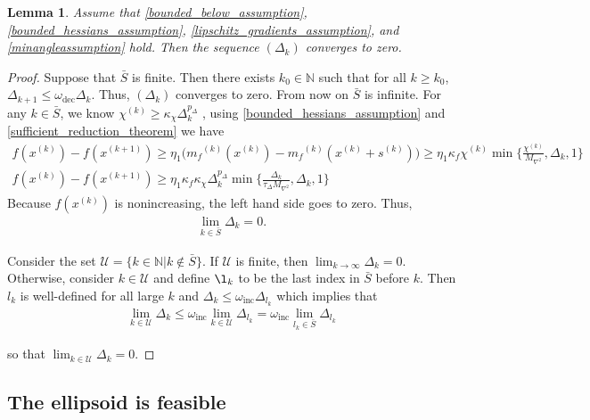 \documentclass{article}
\newtheorem{lemma}[theorem]{Lemma}
\theoremstyle{case}
\newcommand{\chik}{{\chi^{(k)}}}
\newcommand{\dk}{\Delta_k}
\newcommand{\dkpo}{\Delta_{k+1}}
\newcommand{\maxhessian}{{M_{\nabla^2}}}
\newcommand{\mfk}{{{m}_f}^{(k)}}
\newcommand{\naturals}{\mathbb N}
\newcommand{\oalpha}{\tau_{\Delta}}
\newcommand{\omegadec}{\omega_{\text{dec}}}
\newcommand{\omegainc}{\omega_{\text{inc}}}
\newcommand{\sk}{{{s}^{(k)}}}
\newcommand{\xkpo}{{{x}^{(k+1)}}}
\newcommand{\xk}{{x^{(k)}}}
\begin{document}
\begin{lemma}
\label{delta_to_zero}
Assume that
\cref{bounded_below_assumption},
\cref{bounded_hessians_assumption},
\cref{lipschitz_gradients_assumption},
and \cref{minangleassumption} hold.
Then the sequence $(\dk)$ converges to zero.
\end{lemma}
 

\begin{proof}

Suppose that $\bar{S}$ is finite. Then there exists $k_0 \in \naturals$ such that for all $k \ge  k_0$, $\dkpo \le \omegadec \dk$.
Thus, $(\dk)$ converges to zero.
From now on $\bar{S}$ is infinite.  
For any $k \in \bar{S}$, we know $\chik \ge \kappa_{\chi}\dk^{p_{\Delta}}$ , using \cref{bounded_hessians_assumption} and \cref{sufficient_reduction_theorem} we have
\begin{align*}
f(\xk) -  f(\xkpo) \ge \eta_1 \big (\mfk(\xk) - \mfk(\xk + \sk)\big ) \ge \eta_1 \kappa_f \chik \min\{\frac{\chik}{\maxhessian}, \dk, 1\}\\
f(\xk) - f(\xkpo) \ge \eta_1\kappa_f \kappa_{\chi}\dk^{p_{\Delta}}\min\{\frac{\dk}{\oalpha \maxhessian}, \dk, 1\}
\end{align*}
Because $f(\xk)$ is nonincreasing, the left hand side goes to zero.
Thus,
\begin{align}
\lim_{k \in \bar{S}} \dk = 0.
\end{align}

Consider the set
$\mathcal U = \{ k \in \naturals | k \not \in \bar S \}$.
If $\mathcal U$ is finite, then $\lim_{k\to\infty}\dk = 0$.
Otherwise, consider $k \in \mathcal U$ and define $\l_k$ to be the last index in $\bar S$ before $k$.
Then $l_k$ is well-defined for all large $k$  and $\dk \le \omegainc \Delta_{l_k}$ which implies that
\begin{align}
\lim_{k \in \mathcal U } \dk \le \omegainc \lim_{k \in \mathcal U} \Delta_{l_k} = \omegainc \lim_{l_k \in \bar{S}} \Delta_{l_k}
\end{align}

so that $\lim_{k \in \mathcal U} \dk = 0$.
\end{proof}




\subsection{The ellipsoid is feasible}
\end{document}
